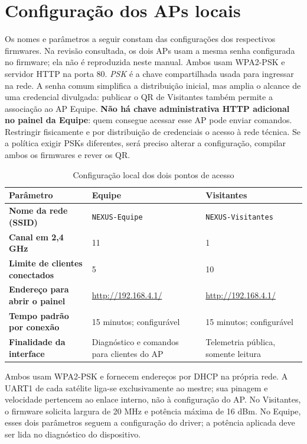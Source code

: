 \section{Configuração dos APs locais}\label{sec:aps-locais}
Os nomes e parâmetros a seguir constam das configurações dos respectivos firmwares. Na revisão consultada, os dois APs usam a mesma senha configurada no firmware; ela não é reproduzida neste manual. Ambos usam WPA2-PSK e servidor HTTP na porta 80. \emph{PSK} é a chave compartilhada usada para ingressar na rede. A senha comum simplifica a distribuição inicial, mas amplia o alcance de uma credencial divulgada: publicar o QR de Visitantes também permite a associação ao AP Equipe. \textbf{Não há chave administrativa HTTP adicional no painel da Equipe}: quem consegue acessar esse AP pode enviar comandos. Restringir fisicamente e por distribuição de credenciais o acesso à rede técnica. Se a política exigir PSKs diferentes, será preciso alterar a configuração, compilar ambos os firmwares e rever os QR.

\begin{table}[htbp]\centering\small
\caption{Configuração local dos dois pontos de acesso}\label{tab:aps-wifi}
\begin{tabularx}{\textwidth}{@{}>{\raggedright\arraybackslash\bfseries}p{3.2cm}X X@{}}
\toprule
Parâmetro & Equipe & Visitantes\\
\midrule
Nome da rede (SSID) & \texttt{NEXUS-Equipe} & \texttt{NEXUS-Visitantes}\\
Canal em 2,4 GHz & 11 & 1\\
Limite de clientes conectados & 5 & 10\\
Endereço para abrir o painel & \url{http://192.168.4.1/} & \url{http://192.168.4.1/}\\
Tempo padrão por conexão & 15 minutos; configurável & 15 minutos; configurável\\
Finalidade da interface & Diagnóstico e comandos para clientes do AP & Telemetria pública, somente leitura\\
\bottomrule
\end{tabularx}
\end{table}

Ambos usam WPA2-PSK e fornecem endereços por DHCP na própria rede. A UART1 de cada satélite liga-se exclusivamente ao mestre; sua pinagem e velocidade pertencem ao enlace interno, não à configuração do AP. No Visitantes, o firmware solicita largura de 20 MHz e potência máxima de 16 dBm. No Equipe, esses dois parâmetros seguem a configuração do driver; a potência aplicada deve ser lida no diagnóstico do dispositivo.

